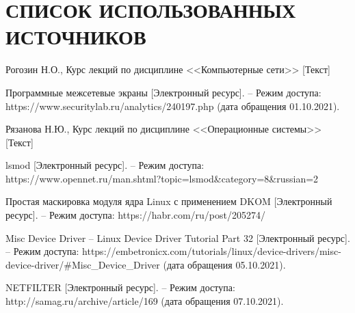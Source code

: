 \section*{СПИСОК ИСПОЛЬЗОВАННЫХ ИСТОЧНИКОВ}

\begin{thebibliography}{9}
	 Рогозин Н.О., Курс лекций по дисциплине <<Компьютерные сети>> [Текст]
	
	 Программные межсетевые экраны [Электронный ресурс]. -- Режим доступа: https://www.securitylab.ru/analytics/240197.php (дата обращения 01.10.2021).
	
	 Рязанова Н.Ю., Курс лекций по дисциплине <<Операционные системы>> [Текст]
	
	 lsmod [Электронный ресурс]. -- Режим доступа: https://www.opennet.ru/man.shtml?topic=lsmod\&category=8\&russian=2
	
	 Простая маскировка модуля ядра Linux с применением DKOM [Электронный ресурс]. -- Режим доступа: https://habr.com/ru/post/205274/
	
	 Misc Device Driver -- Linux Device Driver Tutorial Part 32 [Электронный ресурс]. --  Режим доступа: https://embetronicx.com/tutorials/linux/device-drivers/misc-device-driver/\#Misc\_Device\_Driver (дата обращения 05.10.2021).
	
	 NETFILTER [Электронный ресурс]. -- Режим доступа: http://samag.ru/archive/article/169 (дата обращения 07.10.2021).
	
\end{thebibliography}
		
		
